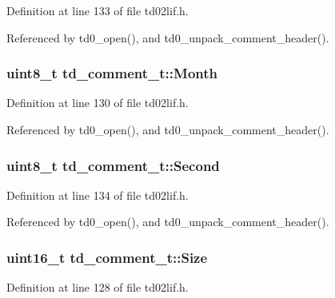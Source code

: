 Definition at line 133 of file td02lif.\+h.



Referenced by td0\+\_\+open(), and td0\+\_\+unpack\+\_\+comment\+\_\+header().

\subsubsection[{\texorpdfstring{Month}{Month}}]{\setlength{\rightskip}{0pt plus 5cm}uint8\+\_\+t td\+\_\+comment\+\_\+t\+::\+Month}\hypertarget{structtd__comment__t_ac926fbfad0e3544bb45bb05b7cd66c49}{}\label{structtd__comment__t_ac926fbfad0e3544bb45bb05b7cd66c49}


Definition at line 130 of file td02lif.\+h.



Referenced by td0\+\_\+open(), and td0\+\_\+unpack\+\_\+comment\+\_\+header().

\subsubsection[{\texorpdfstring{Second}{Second}}]{\setlength{\rightskip}{0pt plus 5cm}uint8\+\_\+t td\+\_\+comment\+\_\+t\+::\+Second}\hypertarget{structtd__comment__t_ae89673be13e6cad1c83bd51034689248}{}\label{structtd__comment__t_ae89673be13e6cad1c83bd51034689248}


Definition at line 134 of file td02lif.\+h.



Referenced by td0\+\_\+open(), and td0\+\_\+unpack\+\_\+comment\+\_\+header().

\subsubsection[{\texorpdfstring{Size}{Size}}]{\setlength{\rightskip}{0pt plus 5cm}uint16\+\_\+t td\+\_\+comment\+\_\+t\+::\+Size}\hypertarget{structtd__comment__t_aca61f38ae62a6de2ff0eab7da2c25e11}{}\label{structtd__comment__t_aca61f38ae62a6de2ff0eab7da2c25e11}


Definition at line 128 of file td02lif.\+h.



